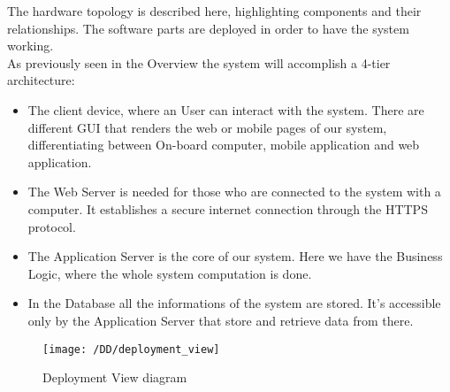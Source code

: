 The hardware topology is described here, highlighting components and their relationships. The software parts are deployed in order to have the system working.
\\As previously seen in the Overview the system will accomplish a 4-tier architecture:
\begin{itemize}
	\item{The client device, where an User can interact with the system. There are different GUI that renders the web or mobile pages of our system, differentiating between On-board computer, mobile application and web application.}
	\item{ The Web Server is needed for those who are connected to the system with a computer. It establishes a secure internet connection through the HTTPS protocol.}
	\item{The Application Server is the core of our system. Here we have the Business Logic, where the whole system computation is done.}
	\item{In the Database all the informations of the system are stored. It's accessible only by the Application Server that store and retrieve data from there.}
\end{itemize} 

\begin{figure}[!ht]
  \centering
  \vspace{0.1cm}
  \texttt{[image: /DD/deployment\_view]}\\
  \vspace{0.1cm}
  \caption{Deployment View diagram} 
  \label{fig:DeploymentView} 
\end{figure}
